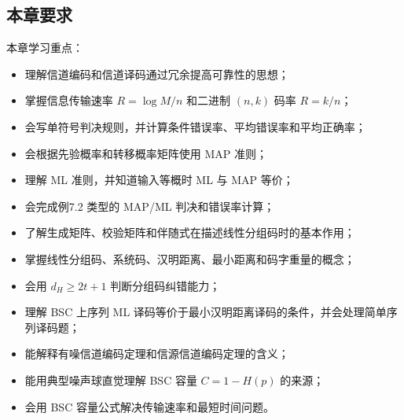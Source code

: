 \subsection{本章要求}
本章学习重点：
\begin{itemize}
  \item 理解信道编码和信道译码通过冗余提高可靠性的思想；
  \item 掌握信息传输速率 $R=\log M/n$ 和二进制 $(n,k)$ 码率 $R=k/n$；
  \item 会写单符号判决规则，并计算条件错误率、平均错误率和平均正确率；
  \item 会根据先验概率和转移概率矩阵使用 MAP 准则；
  \item 理解 ML 准则，并知道输入等概时 ML 与 MAP 等价；
  \item 会完成例7.2 类型的 MAP/ML 判决和错误率计算；
  \item 了解生成矩阵、校验矩阵和伴随式在描述线性分组码时的基本作用；
  \item 掌握线性分组码、系统码、汉明距离、最小距离和码字重量的概念；
  \item 会用 $d_H\ge2t+1$ 判断分组码纠错能力；
  \item 理解 BSC 上序列 ML 译码等价于最小汉明距离译码的条件，并会处理简单序列译码题；
  \item 能解释有噪信道编码定理和信源信道编码定理的含义；
  \item 能用典型噪声球直觉理解 BSC 容量 $C=1-H(p)$ 的来源；
  \item 会用 BSC 容量公式解决传输速率和最短时间问题。
\end{itemize}
